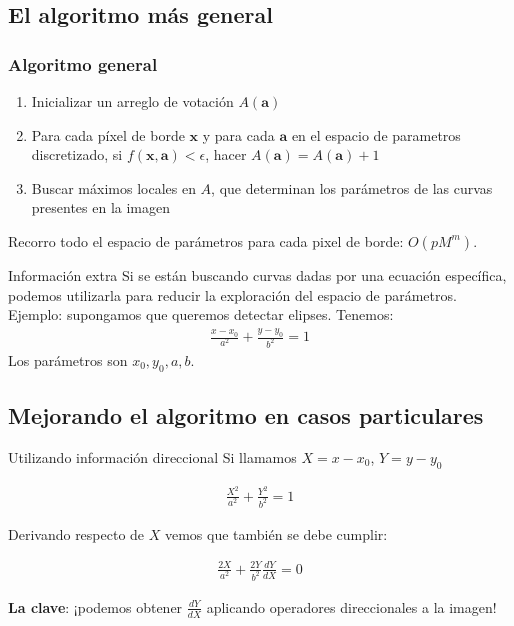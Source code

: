 \documentclass{beamer}
\begin{document}
\subsection{El algoritmo más general} %

\begin{frame}
\frametitle{Algoritmo general}
\begin{enumerate}
    \item Inicializar un arreglo de votación $A(\textbf{a})$
    \item Para cada píxel de borde $\textbf{x}$ y para cada $\textbf{a}$ en el espacio de parametros discretizado, si $f(\textbf{x},\textbf{a}) < \epsilon$, hacer $A(\textbf{a}) = A(\textbf{a})+1$
    \item Buscar máximos locales en $A$, que determinan los parámetros de las curvas presentes en la imagen 
\end{enumerate}

Recorro todo el espacio de parámetros para cada pixel de borde: $O(pM^m)$.
\end{frame}
\begin{frame}{Información extra}
Si se están buscando curvas dadas por una ecuación específica, podemos utilizarla para reducir la exploración del espacio de parámetros.
\\
Ejemplo: supongamos que queremos detectar elipses. Tenemos:
\begin{align*}
    \frac{x - x_0}{a^2} + \frac{y - y_0}{b^2} = 1
\end{align*}
Los parámetros son $x_0, y_0, a, b$.
\end{frame}
\subsection{Mejorando el algoritmo en casos particulares}
\begin{frame}{Utilizando información direccional}
Si llamamos $X = x-x_0$, $Y = y-y_0$

\begin{align*}
    \frac{X^2}{a^2} + \frac{Y^2}{b^2} = 1
\end{align*}

Derivando respecto de $X$ vemos que también se debe cumplir:

\begin{align*}
    \frac{2X}{a^2} + \frac{2Y}{b^2}\frac{dY}{dX} = 0
\end{align*}


\textbf{La clave}: ¡podemos obtener $\frac{dY}{dX}$ aplicando operadores direccionales a la imagen! 

\end{frame}
\end{document}
